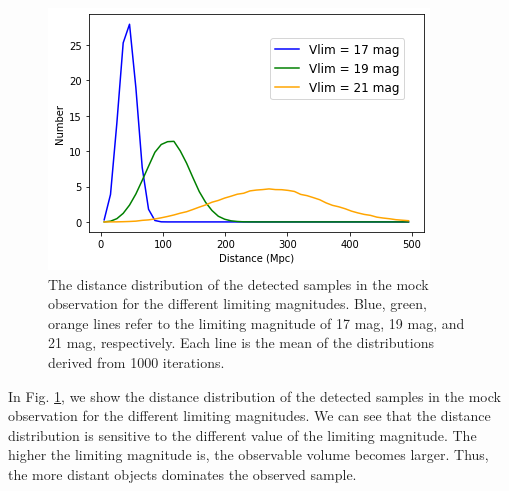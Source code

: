\documentclass[twocolumn, linenumbers]{aastex62}
\begin{document}
\begin{figure}[t] %
	\includegraphics[width=\columnwidth]{Distance_distribution_different_Vlim.png}
    \caption{The distance distribution of the detected samples in the mock observation for the different limiting magnitudes. Blue, green, orange lines refer to the limiting magnitude of 17 mag, 19 mag, and 21 mag, respectively. Each line is the mean of the distributions derived from 1000 iterations.} 
     \label{Distance_dist_mock_different_Vlim}
\end{figure}

In Fig. \ref{Distance_dist_mock_different_Vlim}, we show the distance distribution of the detected samples in the mock observation for the different limiting magnitudes. We can see that the distance distribution is sensitive to the different value of the limiting magnitude. The higher the limiting magnitude is, the observable volume becomes larger. Thus, the more distant objects dominates the observed sample.
\end{document}
